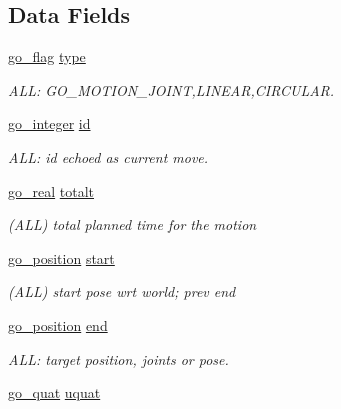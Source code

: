 \subsection*{Data Fields}
\begin{DoxyCompactItemize}
\item 
\hyperlink{gotypes_8h_ae890d9a0ddecc0d3073622cc4312092d}{go\-\_\-flag} \hyperlink{structgomotion_1_1go__motion__spec_a186231a66a1f1f6d6628cd23baf60530}{type}
\begin{DoxyCompactList}\small\item\em A\-L\-L\-: G\-O\-\_\-\-M\-O\-T\-I\-O\-N\-\_\-\-J\-O\-I\-N\-T,L\-I\-N\-E\-A\-R,C\-I\-R\-C\-U\-L\-A\-R. \end{DoxyCompactList}\item 
\hyperlink{gotypes_8h_a7d30f606bb0f58ffe2b3bd71e5c8af5c}{go\-\_\-integer} \hyperlink{structgomotion_1_1go__motion__spec_a09732ca7aaddfa7a637f171766329931}{id}
\begin{DoxyCompactList}\small\item\em A\-L\-L\-: id echoed as current move. \end{DoxyCompactList}\item 
\hyperlink{gotypes_8h_afd666a2393eebd71ee455846ac9def9b}{go\-\_\-real} \hyperlink{structgomotion_1_1go__motion__spec_abf6e879f2b06d62fe0bec48b9d723186}{totalt}
\begin{DoxyCompactList}\small\item\em (A\-L\-L) total planned time for the motion \end{DoxyCompactList}\item 
\hyperlink{structgomotion_1_1go__position}{go\-\_\-position} \hyperlink{structgomotion_1_1go__motion__spec_a87e745675e617e11ea1783a6ea80afa0}{start}
\begin{DoxyCompactList}\small\item\em (A\-L\-L) start pose wrt world; prev end \end{DoxyCompactList}\item 
\hyperlink{structgomotion_1_1go__position}{go\-\_\-position} \hyperlink{structgomotion_1_1go__motion__spec_a8e19d2d27bfa3a3c633bae73641f4e45}{end}
\begin{DoxyCompactList}\small\item\em A\-L\-L\-: target position, joints or pose. \end{DoxyCompactList}\item 
\hyperlink{structgomotion_1_1go__quat}{go\-\_\-quat} \hyperlink{structgomotion_1_1go__motion__spec_af21779ad35fe55e85d91bf8e133def52}{uquat}

\end{DoxyCompactItemize}
